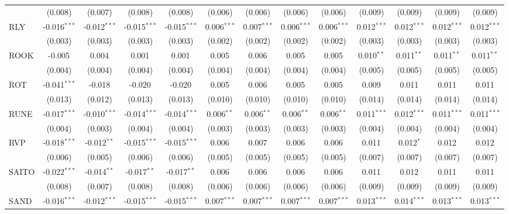 \begin{table}[!htbp]
\begin{tabular}{@{\extracolsep{5pt}}lcccccccccccc}
  & (0.008) & (0.007) & (0.008) & (0.008) & (0.006) & (0.006) & (0.006) & (0.006) & (0.009) & (0.009) & (0.009) & (0.009) \\
 RLY & -0.016$^{***}$ & -0.012$^{***}$ & -0.015$^{***}$ & -0.015$^{***}$ & 0.006$^{***}$ & 0.007$^{***}$ & 0.006$^{***}$ & 0.006$^{***}$ & 0.012$^{***}$ & 0.012$^{***}$ & 0.012$^{***}$ & 0.012$^{***}$ \\
  & (0.003) & (0.003) & (0.003) & (0.003) & (0.002) & (0.002) & (0.002) & (0.002) & (0.003) & (0.003) & (0.003) & (0.003) \\
 ROOK & -0.005$^{}$ & 0.004$^{}$ & 0.001$^{}$ & 0.001$^{}$ & 0.005$^{}$ & 0.006$^{}$ & 0.005$^{}$ & 0.005$^{}$ & 0.010$^{**}$ & 0.011$^{**}$ & 0.011$^{**}$ & 0.011$^{**}$ \\
  & (0.004) & (0.004) & (0.004) & (0.004) & (0.004) & (0.004) & (0.004) & (0.004) & (0.005) & (0.005) & (0.005) & (0.005) \\
 ROT & -0.041$^{***}$ & -0.018$^{}$ & -0.020$^{}$ & -0.020$^{}$ & 0.005$^{}$ & 0.006$^{}$ & 0.005$^{}$ & 0.005$^{}$ & 0.009$^{}$ & 0.011$^{}$ & 0.011$^{}$ & 0.011$^{}$ \\
  & (0.013) & (0.012) & (0.013) & (0.013) & (0.010) & (0.010) & (0.010) & (0.010) & (0.014) & (0.014) & (0.014) & (0.014) \\
 RUNE & -0.017$^{***}$ & -0.010$^{***}$ & -0.014$^{***}$ & -0.014$^{***}$ & 0.006$^{**}$ & 0.006$^{**}$ & 0.006$^{**}$ & 0.006$^{**}$ & 0.011$^{***}$ & 0.012$^{***}$ & 0.011$^{***}$ & 0.011$^{***}$ \\
  & (0.004) & (0.003) & (0.004) & (0.004) & (0.003) & (0.003) & (0.003) & (0.003) & (0.004) & (0.004) & (0.004) & (0.004) \\
 RVP & -0.018$^{***}$ & -0.012$^{**}$ & -0.015$^{***}$ & -0.015$^{***}$ & 0.006$^{}$ & 0.007$^{}$ & 0.006$^{}$ & 0.006$^{}$ & 0.011$^{}$ & 0.012$^{*}$ & 0.012$^{}$ & 0.012$^{}$ \\
  & (0.006) & (0.005) & (0.006) & (0.006) & (0.005) & (0.005) & (0.005) & (0.005) & (0.007) & (0.007) & (0.007) & (0.007) \\
 SAITO & -0.022$^{***}$ & -0.014$^{**}$ & -0.017$^{**}$ & -0.017$^{**}$ & 0.006$^{}$ & 0.006$^{}$ & 0.006$^{}$ & 0.006$^{}$ & 0.011$^{}$ & 0.012$^{}$ & 0.011$^{}$ & 0.011$^{}$ \\
  & (0.008) & (0.007) & (0.008) & (0.008) & (0.006) & (0.006) & (0.006) & (0.006) & (0.009) & (0.009) & (0.009) & (0.009) \\
 SAND & -0.016$^{***}$ & -0.012$^{***}$ & -0.015$^{***}$ & -0.015$^{***}$ & 0.007$^{***}$ & 0.007$^{***}$ & 0.007$^{***}$ & 0.007$^{***}$ & 0.013$^{***}$ & 0.014$^{***}$ & 0.013$^{***}$ & 0.013$^{***}$ \\

\end{tabular}
\end{table}
